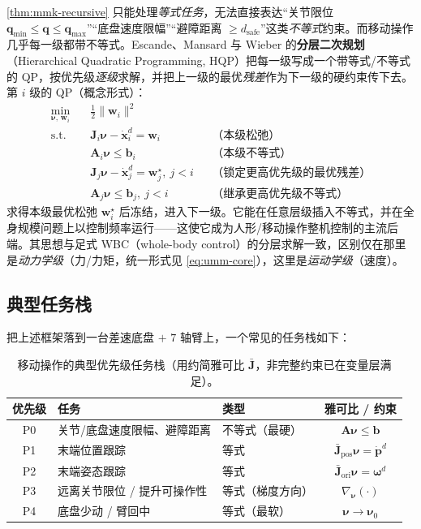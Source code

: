 \cref{thm:mmk-recursive} 只能处理\emph{等式任务}，无法直接表达“关节限位 $\mathbf{q}_{\min}\le\mathbf{q}\le\mathbf{q}_{\max}$”“底盘速度限幅”“避障距离 $\ge d_{\text{safe}}$”这类\emph{不等式}约束。而移动操作几乎每一级都带不等式。Escande、Mansard 与 Wieber 的\textbf{分层二次规划}（Hierarchical Quadratic Programming, HQP）把每一级写成一个带等式/不等式的 QP，按优先级\emph{逐级}求解，并把上一级的最优\emph{残差}作为下一级的硬约束传下去。第 $i$ 级的 QP（概念形式）：
\begin{equation}
\begin{aligned}
  \min_{\boldsymbol{\nu},\,\mathbf{w}_i}\quad& \tfrac12\|\mathbf{w}_i\|^2\\
  \text{s.t.}\quad& \mathbf{J}_i\boldsymbol{\nu}-\dot{\mathbf{x}}_i^d=\mathbf{w}_i &&\text{（本级松弛）}\\
  & \mathbf{A}_i\boldsymbol{\nu}\le\mathbf{b}_i &&\text{（本级不等式）}\\
  & \mathbf{J}_j\boldsymbol{\nu}-\dot{\mathbf{x}}_j^d=\mathbf{w}_j^\star,\ j<i &&\text{（锁定更高优先级的最优残差）}\\
  & \mathbf{A}_j\boldsymbol{\nu}\le\mathbf{b}_j,\ j<i &&\text{（继承更高优先级不等式）}
\end{aligned}
\label{eq:mmk-hqp}
\end{equation}
求得本级最优松弛 $\mathbf{w}_i^\star$ 后冻结，进入下一级。它能在任意层级插入不等式，并在全身规模问题上以控制频率运行——这使它成为人形/移动操作整机控制的主流后端。其思想与足式 WBC（whole-body control）的分层求解一致，区别仅在那里是\emph{动力学级}（力/力矩，统一形式见 \cref{eq:umm-core}），这里是\emph{运动学级}（速度）。

\subsection{典型任务栈}
\label{sec:mmk-stack}

把上述框架落到一台差速底盘 $+$ $7$ 轴臂上，一个常见的任务栈如下：

\begin{table}[H]\centering\small
\caption{移动操作的典型优先级任务栈（用约简雅可比 $\bar{\mathbf{J}}$，非完整约束已在变量层满足）。}
\label{tab:mmk-stack}
\begin{tabular}{cllc}
\toprule
优先级 & 任务 & 类型 & 雅可比 / 约束 \\
\midrule
P0 & 关节/底盘速度限幅、避障距离 & 不等式（最硬） & $\mathbf{A}\boldsymbol{\nu}\le\mathbf{b}$ \\
P1 & 末端位置跟踪 & 等式 & $\bar{\mathbf{J}}_{\text{pos}}\boldsymbol{\nu}=\dot{\mathbf{p}}^d$ \\
P2 & 末端姿态跟踪 & 等式 & $\bar{\mathbf{J}}_{\text{ori}}\boldsymbol{\nu}=\boldsymbol{\omega}^d$ \\
P3 & 远离关节限位 / 提升可操作性 & 等式（梯度方向） & $\nabla_{\boldsymbol{\nu}}(\cdot)$ \\
P4 & 底盘少动 / 臂回中 & 等式（最软） & $\boldsymbol{\nu}\to\boldsymbol{\nu}_0$ \\
\bottomrule
\end{tabular}
\end{table}

